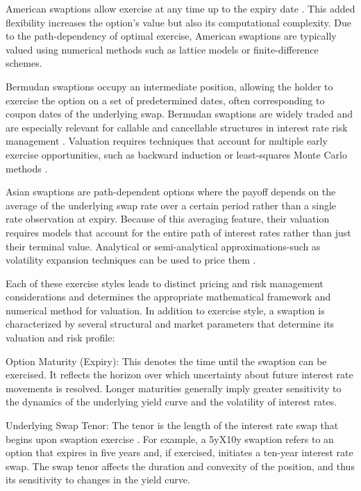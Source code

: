 American swaptions allow exercise at any time up to the expiry date \parencite{karlsson2016exercisepolicies}. This added flexibility increases the option's value but also its computational complexity. Due to the path-dependency of optimal exercise, American swaptions are typically valued using numerical methods such as lattice models \parencite{gurrieri2009calibration} or finite-difference \parencite{longstaff2001valuingamericanoptions} schemes.

Bermudan swaptions occupy an intermediate position, allowing the holder to exercise the option on a set of predetermined dates, often corresponding to coupon dates of the underlying swap. Bermudan swaptions are widely traded \parencite{karlsson2016exercisepolicies} and are especially relevant for callable and cancellable structures in interest rate risk management \parencite[p.~22]{rebonato2004interest}. Valuation requires techniques that account for multiple early exercise opportunities, such as backward induction \parencite{karlsson2016exercisepolicies} or least-squares Monte Carlo methods \parencite{longstaff2001valuingamericanoptions}.

Asian swaptions are path-dependent options where the payoff depends on the average of the underlying swap rate over a certain period rather than a single rate observation at expiry. Because of this averaging feature, their valuation requires models that account for the entire path of interest rates rather than just their terminal value. Analytical or semi-analytical approximations-such as volatility expansion techniques can be used to price them \parencite{baaquie2010asianswaptions}.

Each of these exercise styles leads to distinct pricing and risk management considerations and determines the appropriate mathematical framework and numerical method for valuation. In addition to exercise style, a swaption is characterized by several structural and market parameters that determine its valuation and risk profile:

Option Maturity (Expiry): This denotes the time until the swaption can be exercised. It reflects the horizon over which uncertainty about future interest rate movements is resolved. Longer maturities generally imply greater sensitivity to the dynamics of the underlying yield curve and the volatility of interest rates.

Underlying Swap Tenor: The tenor is the length of the interest rate swap that begins upon swaption exercise \parencite[p.~19]{brigo2006interest}. For example, a 5yX10y swaption refers to an option that expires in five years and, if exercised, initiates a ten-year interest rate swap. The swap tenor affects the duration and convexity of the position, and thus its sensitivity to changes in the yield curve.

